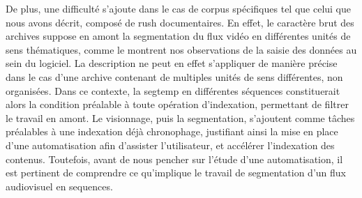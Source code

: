 De plus, une difficulté s'ajoute dans le cas de corpus spécifiques tel que celui que nous avons décrit, composé de \gls{rush} documentaires. En effet, le caractère brut des archives suppose en amont la segmentation du flux vidéo en différentes unités de sens thématiques, comme le montrent nos observations de la saisie des données au sein du logiciel. La description ne peut en effet s'appliquer de manière précise dans le cas d'une archive contenant de multiples unités de sens différentes, non organisées. Dans ce contexte, la \gls{segtemp} en différentes séquences constituerait alors la condition préalable à toute opération d’indexation, permettant de filtrer le travail en amont. Le visionnage, puis la segmentation, s'ajoutent comme tâches préalables à une indexation déjà chronophage, justifiant ainsi la mise en place d’une automatisation afin d’assister l’utilisateur, et accélérer l'indexation des contenus.
Toutefois, avant de nous pencher sur l'étude d'une automatisation, il est pertinent de comprendre ce qu'implique le travail de segmentation d'un flux audiovisuel en \gls{sequence}s.